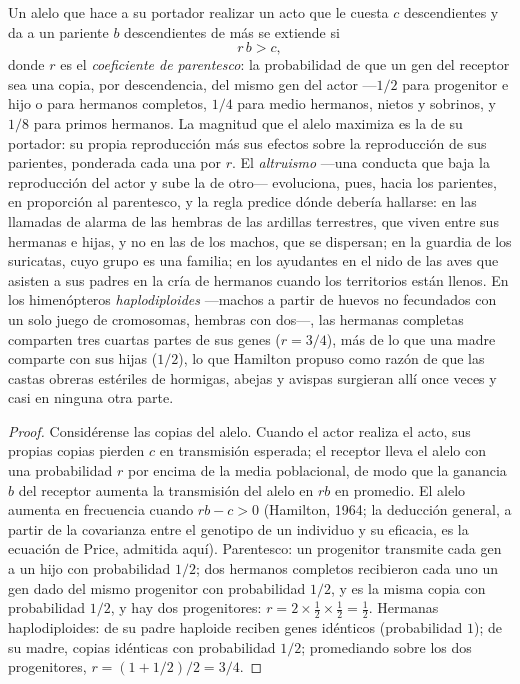 \begin{theorem}\label{thm:b3:behavioural-ecology:hamilton}
Un alelo que hace a su portador realizar un acto que le cuesta $c$
descendientes y da a un pariente $b$ descendientes de más se extiende si
\[
r\,b > c ,
\]
donde $r$ es el \emph{coeficiente de parentesco}: la probabilidad de
que un gen del receptor sea una copia, por descendencia, del mismo gen
del actor ---$1/2$ para progenitor e hijo o para hermanos completos,
$1/4$ para medio hermanos, nietos y sobrinos, y $1/8$ para primos
hermanos. La magnitud que el alelo maximiza es la \emph{} de su portador: su propia reproducción más sus efectos sobre
la reproducción de sus parientes, ponderada cada una por $r$. El
\emph{altruismo} ---una conducta que baja la reproducción del actor y
sube la de otro--- evoluciona, pues, hacia los parientes, en proporción
al parentesco, y la regla predice dónde debería hallarse: en las
llamadas de alarma de las hembras de las ardillas terrestres, que viven
entre sus hermanas e hijas, y no en las de los machos, que se
dispersan; en la guardia de los suricatas, cuyo grupo es una familia;
en los ayudantes en el nido de las aves que asisten a sus padres en la
cría de hermanos cuando los territorios están llenos. En los
himenópteros \emph{haplodiploides} ---machos a partir de huevos no
fecundados con un solo juego de cromosomas, hembras con dos---, las
hermanas completas comparten tres cuartas partes de sus genes
($r = 3/4$), más de lo que una madre comparte con sus hijas ($1/2$), lo
que Hamilton propuso como razón de que las castas obreras estériles de
hormigas, abejas y avispas surgieran allí once veces y casi en ninguna
otra parte.
\end{theorem}
\begin{proof}
Considérense las copias del alelo. Cuando el actor realiza el acto, sus
propias copias pierden $c$ en transmisión esperada; el receptor lleva el
alelo con una probabilidad $r$ por encima de la media poblacional, de
modo que la ganancia $b$ del receptor aumenta la transmisión del alelo
en $rb$ en promedio. El alelo aumenta en frecuencia cuando $rb - c > 0$
(Hamilton, 1964; la deducción general, a partir de la covarianza entre
el genotipo de un individuo y su eficacia, es la ecuación de Price,
admitida aquí). Parentesco: un progenitor transmite cada gen a un hijo
con probabilidad $1/2$; dos hermanos completos recibieron cada uno un
gen dado del mismo progenitor con probabilidad $1/2$, y es la misma
copia con probabilidad $1/2$, y hay dos progenitores:
$r = 2\times\tfrac{1}{2}
\times\tfrac{1}{2} = \tfrac{1}{2}$. Hermanas haplodiploides: de su padre
haploide reciben genes idénticos (probabilidad $1$); de su madre, copias
idénticas con probabilidad $1/2$; promediando sobre los dos
progenitores, $r = (1 + 1/2)/2 = 3/4$.
\end{proof}

